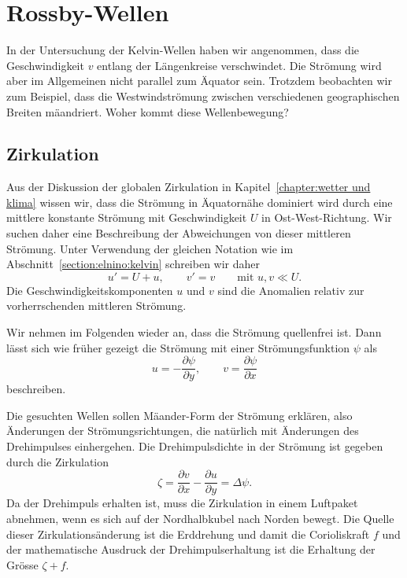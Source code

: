 %
%
%

\section{Rossby-Wellen\label{section:elnino:rossby}}
In der Untersuchung der Kelvin-Wellen haben wir angenommen, dass die
Geschwindigkeit $v$ entlang der Längenkreise verschwindet.
Die Strömung wird aber im Allgemeinen nicht parallel zum Äquator sein.
Trotzdem beobachten wir zum Beispiel, dass die Westwindströmung 
zwischen verschiedenen geographischen Breiten mäandriert.
Woher kommt diese Wellenbewegung?
%

\subsection{Zirkulation\label{subsection:rossby:zirkulation}}
Aus der Diskussion der globalen Zirkulation in
Kapitel~\ref{chapter:wetter und klima} wissen wir, dass die
Strömung in Äquatornähe dominiert wird durch eine mittlere
konstante Strömung mit Geschwindigkeit $U$ in Ost-West-Richtung.
Wir suchen daher eine Beschreibung der Abweichungen von dieser
mittleren Strömung.
Unter Verwendung der gleichen Notation wie im
Abschnitt~\ref{section:elnino:kelvin} schreiben wir daher
\[
u'=U+u,\qquad v'=v\qquad\text{mit $u,v\ll U$}.
\]
Die Geschwindigkeitskomponenten $u$ und $v$ sind die Anomalien relativ
zur vorherrschenden mittleren Strömung.

Wir nehmen im Folgenden wieder an, dass die Strömung quellenfrei ist.
Dann lässt sich wie früher gezeigt die Strömung mit einer
Strömungsfunktion $\psi$ als
\begin{equation}
u=-\frac{\partial \psi}{\partial y},\qquad
v=\frac{\partial\psi}{\partial x}
\label{skript:rossby:geschwindigkeit}
\end{equation}
beschreiben.

Die gesuchten Wellen sollen Mäander-Form der Strömung erklären,
also Änderungen der Strömungsrichtungen, die natürlich mit
Änderungen des Drehimpulses einhergehen.
Die Drehimpulsdichte in der Strömung ist gegeben durch die Zirkulation
\[
\zeta
=
\frac{\partial v}{\partial x} - \frac{\partial u}{\partial y}
=
\Delta \psi.
\]
Da der Drehimpuls erhalten ist, muss die Zirkulation in einem
Luftpaket abnehmen, wenn es sich auf der Nordhalbkubel nach Norden
bewegt.
Die Quelle dieser Zirkulationsänderung ist die Erddrehung und damit
die Corioliskraft $f$ und der mathematische Ausdruck der Drehimpulserhaltung
ist die Erhaltung der Grösse $\zeta+f$.

